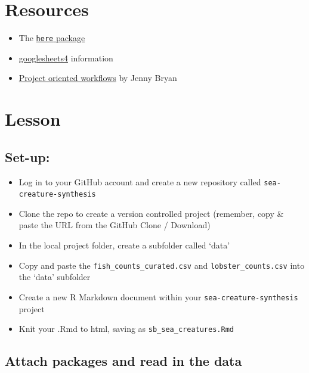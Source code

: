 \documentclass[]{book}
\providecommand{\tightlist}{%
  \setlength{\itemsep}{0pt}\setlength{\parskip}{0pt}}
\begin{document}
\hypertarget{resources-8}{%
\section{Resources}\label{resources-8}}

\begin{itemize}
\tightlist
\item
  The \href{https://github.com/r-lib/here}{\texttt{here} package}
\item
  \href{https://github.com/tidyverse/googlesheets4}{googlesheets4} information
\item
  \href{https://www.tidyverse.org/blog/2017/12/workflow-vs-script/}{Project oriented workflows} by Jenny Bryan
\end{itemize}

\hypertarget{lesson-3}{%
\section{Lesson}\label{lesson-3}}

\hypertarget{set-up}{%
\subsection{Set-up:}\label{set-up}}

\begin{itemize}
\tightlist
\item
  Log in to your GitHub account and create a new repository called \texttt{sea-creature-synthesis}
\item
  Clone the repo to create a version controlled project (remember, copy \& paste the URL from the GitHub Clone / Download)
\item
  In the local project folder, create a subfolder called `data'
\item
  Copy and paste the \texttt{fish\_counts\_curated.csv} and \texttt{lobster\_counts.csv} into the `data' subfolder
\item
  Create a new R Markdown document within your \texttt{sea-creature-synthesis} project
\item
  Knit your .Rmd to html, saving as \texttt{sb\_sea\_creatures.Rmd}
\end{itemize}

\hypertarget{attach-packages-and-read-in-the-data}{%
\subsection{Attach packages and read in the data}\label{attach-packages-and-read-in-the-data}}
\end{document}
